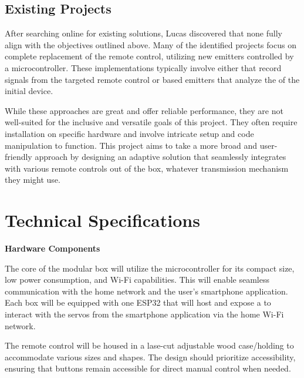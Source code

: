 \subsection{Existing Projects}

After searching online for existing solutions, Lucas discovered that none fully align with the objectives outlined above.
Many of the identified projects focus on complete replacement of the remote control, utilizing new emitters controlled by a microcontroller.
These implementations typically involve either  that record signals from the targeted remote control or  based emitters that analyze the  of the initial device.

While these approaches are great and offer reliable performance, they are not well-suited for the inclusive and versatile goals of this project.
They often require installation on specific hardware and involve intricate setup and code manipulation to function.
This project aims to take a more broad and user-friendly approach by designing an adaptive solution that seamlessly integrates with various remote controls out of the box, whatever transmission mechanism they might use.

\section{Technical Specifications}

\textbf{Hardware Components}

The core of the modular box will utilize the  microcontroller for its compact size, low power consumption, and Wi-Fi capabilities.
This will enable seamless communication with the home network and the user's smartphone application.
Each box will be equipped with one ESP32 that will host and expose a  to interact with the servos from the smartphone application via the home Wi-Fi network.

The remote control will be housed in a lase-cut adjustable wood case/holding to accommodate various sizes and shapes.
The design should prioritize accessibility, ensuring that buttons remain accessible for direct manual control when needed.

